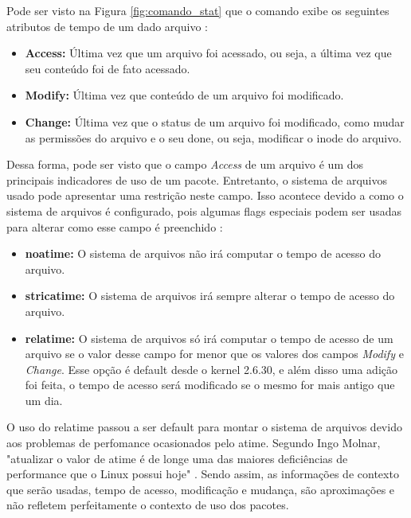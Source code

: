 Pode ser visto na Figura \ref{fig:comando_stat} que o comando exibe os seguintes
atributos de tempo de um dado arquivo \cite{1_haas}:

\begin{itemize}
    \item \textbf{Access:} Última vez que um arquivo foi acessado, ou seja, a
        última vez que seu conteúdo foi de fato acessado.
    \item \textbf{Modify:} Última vez que conteúdo de um arquivo foi modificado.
    \item \textbf{Change:} Última vez que o status de um arquivo foi modificado,
        como mudar as permissões do arquivo e o seu done, ou seja, modificar o
        inode do arquivo.
\end{itemize}

Dessa forma, pode ser visto que o campo \textit{Access} de um arquivo é um dos
principais indicadores de uso de um pacote. Entretanto, o sistema de arquivos
usado pode apresentar uma
restrição neste campo. Isso acontece devido a como o sistema de arquivos é
configurado, pois algumas flags especiais podem ser usadas para alterar como
esse campo é preenchido \cite{2_wiki.debian.org}:

\begin{itemize}
    \item \textbf{noatime:} O sistema de arquivos não irá computar o tempo de
        acesso do arquivo.
    \item \textbf{stricatime:} O sistema de arquivos irá sempre alterar o tempo
        de acesso do arquivo.
    \item \textbf{relatime:} O sistema de arquivos só irá computar o tempo de
        acesso de um arquivo se o valor desse campo for menor que os valores dos
        campos \textit{Modify} e \textit{Change}. Esse opção é default desde
        o kernel 2.6.30, e além disso uma adição foi feita, o tempo de acesso será
        modificado se o mesmo for mais antigo que um dia.
\end{itemize}

O uso do relatime passou a ser default para montar o sistema de arquivos devido
aos problemas de perfomance ocasionados pelo atime. Segundo Ingo Molnar, "atualizar o valor
de atime é de longe uma das maiores deficiências de performance que o Linux possui
hoje" \cite{3_corbet_2007}. Sendo assim, as informações de contexto que serão
usadas, tempo de acesso, modificação e mudança, são aproximações e não
refletem perfeitamente o contexto de uso dos pacotes.

